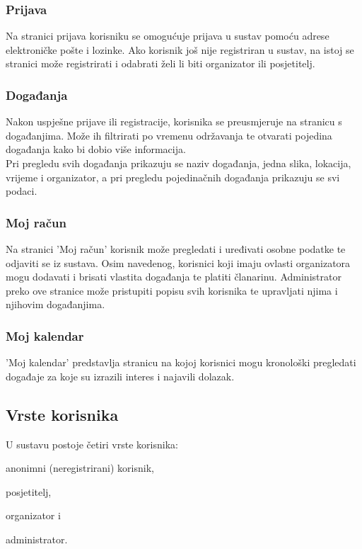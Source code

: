 				\subsubsection{Prijava}
				 Na stranici prijava korisniku se omogućuje prijava u sustav pomoću adrese elektroničke pošte i lozinke. Ako korisnik još nije registriran u sustav, na istoj se stranici može registrirati i odabrati želi li biti organizator ili posjetitelj.
				 
				\subsubsection{Događanja}
				Nakon uspješne prijave ili registracije, korisnika se preusmjeruje na stranicu s događanjima. Može ih filtrirati po vremenu održavanja te otvarati pojedina događanja kako bi dobio više informacija.\\
				Pri pregledu svih događanja prikazuju se naziv događanja, jedna slika, lokacija, vrijeme i organizator, a pri pregledu pojedinačnih događanja prikazuju se svi podaci.
				
				\subsubsection{Moj račun}
				Na stranici 'Moj račun' korisnik može pregledati i uređivati osobne podatke te odjaviti se iz sustava. Osim navedenog, korisnici koji imaju ovlasti organizatora mogu dodavati i brisati vlastita događanja te platiti članarinu. Administrator preko ove stranice može pristupiti popisu svih korisnika te upravljati njima i njihovim događanjima.
			
				\subsubsection{Moj kalendar}
				'Moj kalendar' predstavlja stranicu na kojoj korisnici mogu kronološki pregledati događaje za koje su izrazili interes i najavili dolazak.
				
			
			\subsection{Vrste korisnika}
			U sustavu postoje četiri vrste korisnika:
			\begin{packed_enum}
				\item anonimni (neregistrirani) korisnik,
				\item posjetitelj,
				\item organizator i 
				\item administrator.
			\end{packed_enum}
			
